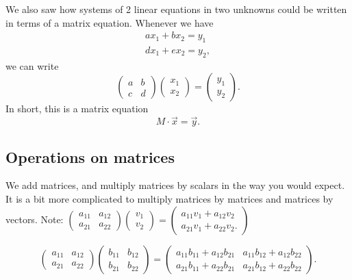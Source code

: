 \documentclass[a4paper, 12pt,oneside,openany]{book}
\begin{document}
We also saw how systems of 2 linear equations in two unknowns could be written in terms of a matrix equation. Whenever we have \begin{align*} ax_1+bx_2=y_1 \\ dx_1+ex_2=y_2,\end{align*} we can write $$\begin{pmatrix} a & b \\ c & d \end{pmatrix} \begin{pmatrix} x_1 \\ x_2 \end{pmatrix} = \begin{pmatrix} y_1 \\ y_2 \end{pmatrix}.$$ In short, this is a matrix equation $$M \cdot \vec{x} = \vec{y}.$$


\subsection{Operations on matrices}

We add matrices, and multiply matrices by scalars in the way you would expect. It is a bit more complicated to multiply matrices by matrices and matrices by vectors. Note: $\begin{pmatrix} a_{11} & a_{12} \\ a_{21} & a_{22} \end{pmatrix} \begin{pmatrix} v_1 \\ v_2 \end{pmatrix} = \begin{pmatrix} a_{11}v_1+a_{12}v_2 \\ a_{21}v_1+a_{22}v_2. \end{pmatrix}$

$$\begin{pmatrix} a_{11} & a_{12} \\ a_{21} & a_{22} \end{pmatrix} \begin{pmatrix} b_{11} & b_{12} \\ b_{21} & b_{22} \end{pmatrix} = \begin{pmatrix} a_{11}b_{11}+a_{12}b_{21} & a_{11}b_{12}+a_{12}b_{22} \\ a_{21}b_{11}+a_{22}b_{21} & a_{21}b_{12}+a_{22}b_{22} \end{pmatrix}.$$
\end{document}
